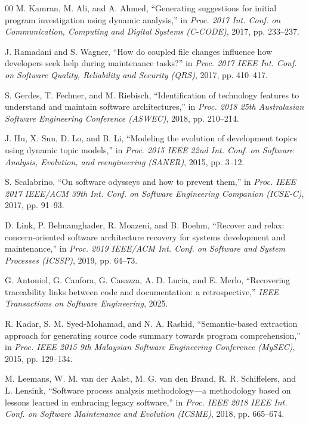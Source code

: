 \documentclass{ieeeaccess}
\begin{document}
\begin{thebibliography}{00}
 M. Kamran, M. Ali, and A. Ahmed, ``Generating suggestions for initial program investigation using dynamic analysis,'' in \emph{Proc. 2017 Int. Conf. on Communication, Computing and Digital Systems (C-CODE)}, 2017, pp. 233--237.

 J. Ramadani and S. Wagner, ``How do coupled file changes influence how developers seek help during maintenance tasks?'' in \emph{Proc. 2017 IEEE Int. Conf. on Software Quality, Reliability and Security (QRS)}, 2017, pp. 410--417.

 S. Gerdes, T. Fechner, and M. Riebisch, ``Identification of technology features to understand and maintain software architectures,'' in \emph{Proc. 2018 25th Australasian Software Engineering Conference (ASWEC)}, 2018, pp. 210--214.

 J. Hu, X. Sun, D. Lo, and B. Li, ``Modeling the evolution of development topics using dynamic topic models,'' in \emph{Proc. 2015 IEEE 22nd Int. Conf. on Software Analysis, Evolution, and reengineering (SANER)}, 2015, pp. 3--12.

 S. Scalabrino, ``On software odysseys and how to prevent them,'' in \emph{Proc. IEEE 2017 IEEE/ACM 39th Int. Conf. on Software Engineering Companion (ICSE-C)}, 2017, pp. 91--93.

 D. Link, P. Behnamghader, R. Moazeni, and B. Boehm, ``Recover and relax: concern-oriented software architecture recovery for systems development and maintenance,'' in \emph{Proc. 2019 IEEE/ACM Int. Conf. on Software and System Processes (ICSSP)}, 2019, pp. 64--73.

 G. Antoniol, G. Canfora, G. Casazza, A. D. Lucia, and E. Merlo, ``Recovering traceability links between code and documentation: a retrospective,'' \emph{IEEE Transactions on Software Engineering}, 2025.

 R. Kadar, S. M. Syed-Mohamad, and N. A. Rashid, ``Semantic-based extraction approach for generating source code summary towards program comprehension,'' in \emph{Proc. IEEE 2015 9th Malaysian Software Engineering Conference (MySEC)}, 2015, pp. 129--134.

 M. Leemans, W. M. van der Aalst, M. G. van den Brand, R. R. Schiffelers, and L. Lensink, ``Software process analysis methodology—a methodology based on lessons learned in embracing legacy software,'' in \emph{Proc. IEEE 2018 IEEE Int. Conf. on Software Maintenance and Evolution (ICSME)}, 2018, pp. 665--674.


\end{thebibliography}
\end{document}
